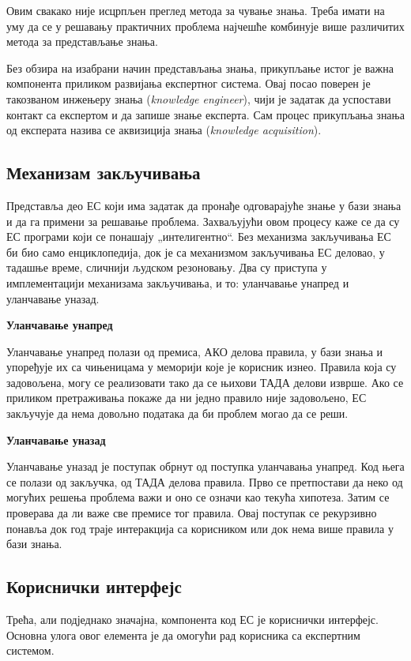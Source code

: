 Овим свакако није исцрпљен преглед метода за чување знања. Треба имати на уму да се у решавању практичних проблема најчешће комбинује више различитих метода за представљање знања.

Без обзира на изабрани начин представљања знања, прикупљање истог је важна компонента приликом развијања експертног система. Овај посао поверен је такозваном инжењеру знања (\textit{knowledge engineer}), чији је задатак да успостави контакт са експертом и да запише знање експерта. Сам процес прикупљања знања од експерата назива се аквизиција знања (\textit{knowledge acquisition}).

\subsection{Механизам закључивања}
Представља део ЕС који има задатак да пронађе одговарајуће знање у бази знања и да га примени за решавање проблема. Захваљујући овом процесу каже се да су ЕС програми који се понашају „интелигентно“. Без механизма закључивања ЕС би био само енциклопедија, док је са механизмом закључивања ЕС деловао, у тадашње време, сличнији људском резоновању. Два су приступа у имплементацији механизама закључивања, и то: уланчавање унапред и уланчавање уназад.

\textbf{Уланчавање унапред}

Уланчавање унапред полази од премиса, АКО делова правила, у бази знања и упоређује их са чињеницама у меморији које је корисник изнео. Правила која су задовољена, могу се реализовати тако да се њихови ТАДА делови изврше. Ако се приликом претраживања покаже да ни једно правило није задовољено, ЕС закључује да нема довољно података да би проблем могао да се реши.

\textbf{Уланчавање уназад}

Уланчавање уназад је поступак обрнут од поступка уланчавања унапред. Код њега се полази од закључка, од ТАДА делова правила. Прво се претпостави да неко од могућих решења проблема важи и оно се означи као текућа хипотеза. Затим се проверава да ли важе све премисе тог правила. Овај поступак се рекурзивно понавља док год траје интеракција са корисником или док нема више правила у бази знања.

\subsection{Кориснички интерфејс}
Трећа, али подједнако значајна, компонента код ЕС је кориснички интерфејс. Основна улога овог елемента је да омогући рад корисника са експертним системом.

